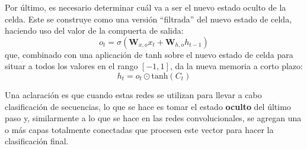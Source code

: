 \documentclass[../../main.tex]{subfiles}
\begin{document}
Por último, es necesario determinar cuál va a ser el nuevo estado oculto de la celda.
Este se construye como una versión ``filtrada'' del nuevo estado de celda, haciendo
uso del valor de la compuerta de salida:
\[
    o_t = \sigma \left( \bm{W}_{x,o} x_t + \bm{W}_{h,o} h_{t-1} \right)
\]
que, combinado con una aplicación de tanh sobre el nuevo estado de celda para situar a
todos los valores en el rango \([-1,1]\), da la nueva memoria a corto plazo:
\[
    h_t = o_t \odot \text{tanh}(C_t)
\]

\bigskip
Una aclaración es que cuando estas redes se utilizan para llevar a cabo clasificación
de secuencias, lo que se hace es tomar el estado \textbf{oculto} del último paso y,
similarmente a lo que se hace en las redes convolucionales, se agregan una o más capas
totalmente conectadas que procesen este vector para hacer la clasificación final.
\end{document}

